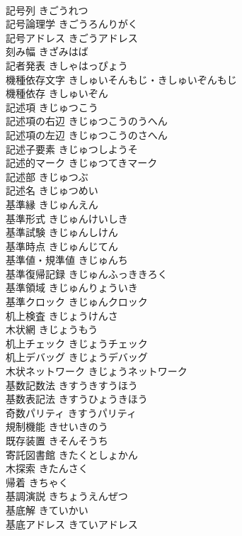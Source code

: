 \documentclass[8pt]{extreport}
\begin{document}
\begin{CJK}{UTF8}{min}
\\	記号列	きごうれつ	
\\	記号論理学	きごうろんりがく	
\\	記号アドレス	きごうアドレス	
\\	刻み幅	きざみはば	
\\	記者発表	きしゃはっぴょう	
\\	機種依存文字	きしゅいそんもじ・きしゅいぞんもじ	
\\	機種依存	きしゅいぞん	
\\	記述項	きじゅつこう	
\\	記述項の右辺	きじゅつこうのうへん	
\\	記述項の左辺	きじゅつこうのさへん	
\\	記述子要素	きじゅつしようそ	
\\	記述的マーク	きじゅつてきマーク	
\\	記述部	きじゅつぶ	
\\	記述名	きじゅつめい	
\\	基準縁	きじゅんえん	
\\	基準形式	きじゅんけいしき	
\\	基準試験	きじゅんしけん	
\\	基準時点	きじゅんじてん	
\\	基準値・規準値	きじゅんち	
\\	基準復帰記録	きじゅんふっききろく	
\\	基準領域	きじゅんりょういき	
\\	基準クロック	きじゅんクロック	
\\	机上検査	きじょうけんさ	
\\	木状網	きじょうもう	
\\	机上チェック	きじょうチェック	
\\	机上デバッグ	きじょうデバッグ	
\\	木状ネットワーク	きじょうネットワーク	
\\	基数記数法	きすうきすうほう	
\\	基数表記法	きすうひょうきほう	
\\	奇数パリティ	きすうパリティ	
\\	規制機能	きせいきのう	
\\	既存装置	きそんそうち	
\\	寄託図書館	きたくとしょかん	
\\	木探索	きたんさく	
\\	帰着	きちゃく	
\\	基調演説	きちょうえんぜつ	
\\	基底解	きていかい	
\\	基底アドレス	きていアドレス	

\end{CJK}
\end{document}
